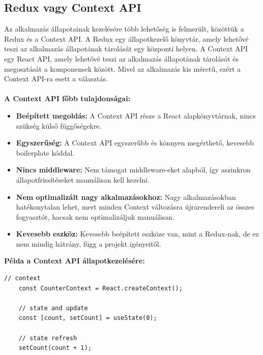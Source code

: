 \subsection*{Redux vagy Context API}
Az alkalmazás állapotainak kezelésére több lehetőség is felmerült, közöttük a Redux és a Context API.
A Redux egy állapotkezelő könyvtár, amely lehetővé teszi az alkalmazás állapotának tárolását egy központi helyen.
A Context API egy React API, amely lehetővé teszi az alkalmazás állapotának tárolását és megosztását a komponensek között.
Mivel az alkalmazás kis méretű, ezért a Context API-ra esett a választás.
\\
\\
\textbf{A Context API főbb tulajdonságai:}
\begin{itemize}
    \item \textbf{Beépített megoldás:} A Context API része a React alapkönyvtárnak, nincs szükség külső függőségekre.
    \item \textbf{Egyszerűség:} A Context API egyszerűbb és könnyen megérthető, kevesebb boilerplate kóddal.
    \item \textbf{Nincs middleware:} Nem támogat middleware-eket alapból, így aszinkron állapotfrissítéseket manuálisan kell kezelni.
    \item \textbf{Nem optimalizált nagy alkalmazásokhoz:} Nagy alkalmazásokban hatékonytalan lehet, mert minden Context változásra újrarendereli az összes fogyasztót, hacsak nem optimalizáljuk manuálisan.
    \item \textbf{Kevesebb eszköz:} Kevesebb beépített eszköze van, mint a Redux-nak, de ez nem mindig hátrány, függ a projekt igényeitől.
\end{itemize}
\textbf{Példa a Context API állapotkezelésére:}
\begin{lstlisting}[style=es6, morekeywords={document, P5, katex},caption={Context API állapotkezelése}]
    // context
    const CounterContext = React.createContext();
    
    // state and update
    const [count, setCount] = useState(0);
    
    // state refresh
    setCount(count + 1);
\end{lstlisting}

\vspace{2em}

